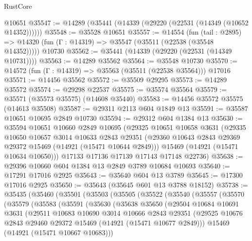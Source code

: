\begin{lexlean}{RustCore}
\begin{coremodule}
    @10651
@35547 := @14289 (@35441 (@14339 (@29220 (@22531 (@14349 (@10652 @14352))))))
@35548 := @35528 @10651
@35557 := @14554
    (fun (tail : @2895) => @14320 (fun (Γ : @14319) => @35547 (@35511 (@22538 (@35548 @14352)))))
    @10730
@35562 := @35441 (@14339 (@29220 (@22531 (@14349 @10731))))
@35563 := @14289 @35562
@35564 := @35548 @10730
@35570 := @14572 (fun (Γ : @14319) => @35563 (@35511 (@22538 @35564))) @17016
@35571 := @14456 @35562
@35572 := @35509 @29295
@35573 := @14289 @35572
@35574 := @29298 @22537
@35575 := @35574 @35564
@35579 := @35571 (@35573 @35575) (@14608 @35440)
@35583 := @14456 @35572 @35575 (@14613 @35508)
@35587 := @29311 @2113 @604 @1849 @13
@35591 := @35587 @10651 @10695 @2849 @10730
@35594 := @29312 @604 @1384 @13
@35630 := @35594
    @10651
    @10660
    @2849
    @10695
    (@29325
      @10651
      @10658
      @3631
      (@29335
        @10650
        @10657
        @3014
        @10633
        @2843
        @29351
        (@29360 @10643 @2843 @29369 @29372 @15469 (@14921 (@15471 @10644 @2849)))
        @15469
        (@14921 (@15471 @10634 @10650)))
      @17133
      @17136
      @17139
      @17143
      @17148
      @22736)
@35638 := @29396 @10660 @604 @1384 @13 @2849 @3789 @10684 @10693
@35640 := @17291 @17016 @2925
@35643 := @35640 @604 @13 @3789
@35645 := @17300 @17016 @2925
@35650 := @35643 (@35645 @601 @13 @3788 @18152)
@35738 := @35435
    (@35460
      (@35501
        (@35503
          (@35505
            (@35522
              (@35540
                (@35557
                  (@35570
                    (@35579
                      (@35583
                        (@35591
                          (@35630
                            (@35638
                              @35650
                              (@29504
                                @10684
                                @10691
                                @3631
                                (@29511
                                  @10683
                                  @10690
                                  @3014
                                  @10666
                                  @2843
                                  @29351
                                  (@29525
                                    @10676
                                    @2843
                                    @29460
                                    @29372
                                    @15469
                                    (@14921 (@15471 @10677 @2849)))
                                  @15469
                                  (@14921 (@15471 @10667 @10683)))

\end{coremodule}
\end{lexlean}
